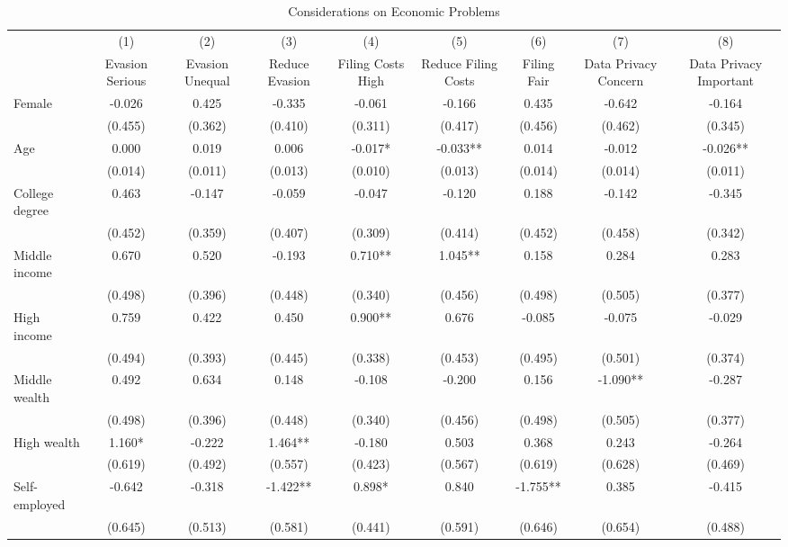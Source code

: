 \documentclass[11pt]{article}
\begin{document}
\begin{landscape}
\begin{table}[!htbp]\centering
\caption{Considerations on Economic Problems}
\label{tab:considerationseconomicproblems_c}
\begin{threeparttable}
\footnotesize
\begin{tabular}{l|cccccccc}
\toprule
& (1) & (2) & (3) & (4) & (5) & (6) & (7) & (8) \\
& Evasion Serious & Evasion Unequal & Reduce Evasion & Filing Costs High & Reduce Filing Costs & Filing Fair & Data Privacy Concern & Data Privacy Important \\
\midrule
Female & -0.026 & 0.425 & -0.335 & -0.061 & -0.166 & 0.435 & -0.642 & -0.164 \\
 & (0.455) & (0.362) & (0.410) & (0.311) & (0.417) & (0.456) & (0.462) & (0.345) \\
Age & 0.000 & 0.019 & 0.006 & -0.017* & -0.033** & 0.014 & -0.012 & -0.026** \\
 & (0.014) & (0.011) & (0.013) & (0.010) & (0.013) & (0.014) & (0.014) & (0.011) \\
College degree & 0.463 & -0.147 & -0.059 & -0.047 & -0.120 & 0.188 & -0.142 & -0.345 \\
 & (0.452) & (0.359) & (0.407) & (0.309) & (0.414) & (0.452) & (0.458) & (0.342) \\
Middle income & 0.670 & 0.520 & -0.193 & 0.710** & 1.045** & 0.158 & 0.284 & 0.283 \\
 & (0.498) & (0.396) & (0.448) & (0.340) & (0.456) & (0.498) & (0.505) & (0.377) \\
High income & 0.759 & 0.422 & 0.450 & 0.900** & 0.676 & -0.085 & -0.075 & -0.029 \\
 & (0.494) & (0.393) & (0.445) & (0.338) & (0.453) & (0.495) & (0.501) & (0.374) \\
Middle wealth & 0.492 & 0.634 & 0.148 & -0.108 & -0.200 & 0.156 & -1.090** & -0.287 \\
 & (0.498) & (0.396) & (0.448) & (0.340) & (0.456) & (0.498) & (0.505) & (0.377) \\
High wealth & 1.160* & -0.222 & 1.464** & -0.180 & 0.503 & 0.368 & 0.243 & -0.264 \\
 & (0.619) & (0.492) & (0.557) & (0.423) & (0.567) & (0.619) & (0.628) & (0.469) \\
Self-employed & -0.642 & -0.318 & -1.422** & 0.898* & 0.840 & -1.755** & 0.385 & -0.415 \\
 & (0.645) & (0.513) & (0.581) & (0.441) & (0.591) & (0.646) & (0.654) & (0.488) \\

\end{tabular}
\end{threeparttable}
\end{table}
\end{landscape}
\end{document}
